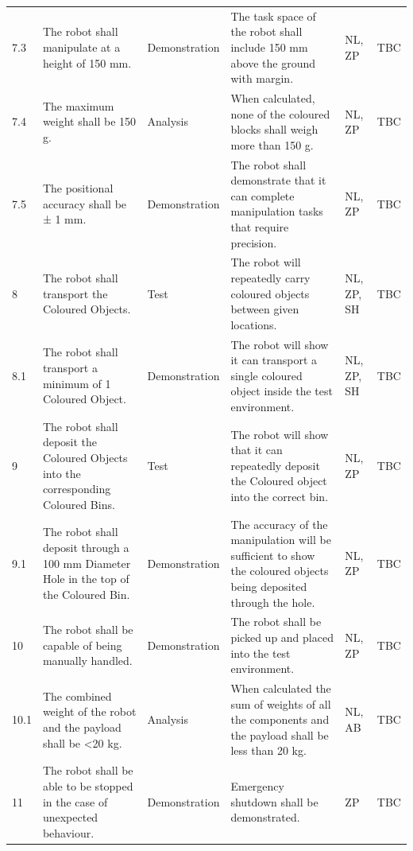 \begin{landscape}
\begin{longtable}{@{}R{1.2cm} R{9.5cm} R{3.5cm} R{4.0cm} R{3.0cm} R{1.0cm}@{}}
7.3 & The robot shall manipulate at a height of 150 mm. & Demonstration & The task space of the robot shall include 150 mm above the ground with margin. & NL, ZP & TBC \\[4pt]

7.4 & The maximum weight shall be 150 g. & Analysis & When calculated, none of the coloured blocks shall weigh more than 150 g. & NL, ZP & TBC \\[4pt]

7.5 & The positional accuracy shall be ± 1 mm. & Demonstration & The robot shall demonstrate that it can complete manipulation tasks that require precision. & NL, ZP & TBC \\[4pt]

8 & The robot shall transport the Coloured Objects. & Test & The robot will repeatedly carry coloured objects between given locations. & NL, ZP, SH & TBC \\[4pt]

8.1 & The robot shall transport a minimum of 1 Coloured Object. & Demonstration & The robot will show it can transport a single coloured object inside the test environment. & NL, ZP, SH & TBC \\[4pt]

9 & The robot shall deposit the Coloured Objects into the corresponding Coloured Bins. & Test & The robot will show that it can repeatedly deposit the Coloured object into the correct bin. & NL, ZP & TBC \\[4pt]

9.1 & The robot shall deposit through a 100 mm Diameter Hole in the top of the Coloured Bin. & Demonstration & The accuracy of the manipulation will be sufficient to show the coloured objects being deposited through the hole. & NL, ZP & TBC \\[4pt]

10 & The robot shall be capable of being manually handled. & Demonstration & The robot shall be picked up and placed into the test environment. & NL, ZP & TBC \\[4pt]

10.1 & The combined weight of the robot and the payload shall be <20 kg. & Analysis & When calculated the sum of weights of all the components and the payload shall be less than 20 kg. & NL, AB & TBC \\[4pt]

11 & The robot shall be able to be stopped in the case of unexpected behaviour. & Demonstration & Emergency shutdown shall be demonstrated. & ZP & TBC \\[4pt]


\end{longtable}
\end{landscape}
